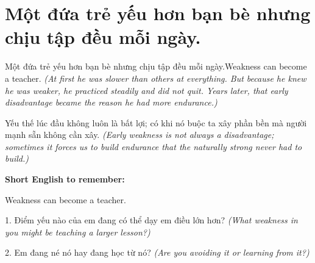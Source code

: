 \section{Một đứa trẻ yếu hơn bạn bè nhưng chịu tập đều mỗi ngày.}
\begin{truyen}{Một đứa trẻ yếu hơn bạn bè nhưng chịu tập đều mỗi ngày.}{Weakness can become a teacher.}
\textit{(At first he was slower than others at everything. But because he knew he was weaker, he practiced steadily and did not quit. Years later, that early disadvantage became the reason he had more endurance.)}
\end{truyen}
\begin{baihoc}
Yếu thế lúc đầu không luôn là bất lợi; có khi nó buộc ta xây phần bền mà người mạnh sẵn không cần xây.
\textit{(Early weakness is not always a disadvantage; sometimes it forces us to build endurance that the naturally strong never had to build.)}
\end{baihoc}
\begin{ghinhoanh}
\textbf{Short English to remember:}

Weakness can become a teacher.
\end{ghinhoanh}
\begin{tuhocnhanh}
1. Điểm yếu nào của em đang có thể dạy em điều lớn hơn? \textit{(What weakness in you might be teaching a larger lesson?)}

2. Em đang né nó hay đang học từ nó? \textit{(Are you avoiding it or learning from it?)}
\end{tuhocnhanh}
\ngancach

